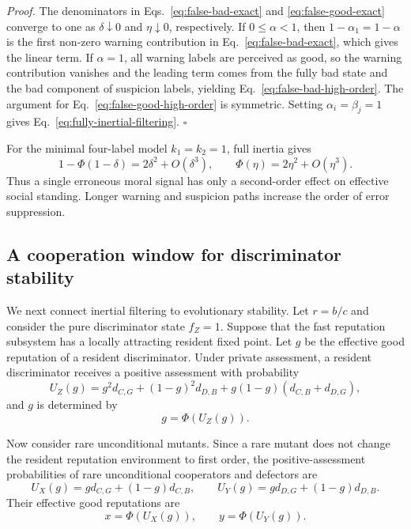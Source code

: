 \documentclass[fleqn,10pt]{wlscirep}
\begin{document}
\textit{Proof.}
The denominators in Eqs.~\eqref{eq:false-bad-exact} and \eqref{eq:false-good-exact} converge to one as $\delta\downarrow 0$ and $\eta\downarrow 0$, respectively. If $0\le\alpha<1$, then $1-\alpha_1=1-\alpha$ is the first non-zero warning contribution in Eq.~\eqref{eq:false-bad-exact}, which gives the linear term. If $\alpha=1$, all warning labels are perceived as good, so the warning contribution vanishes and the leading term comes from the fully bad state and the bad component of suspicion labels, yielding Eq.~\eqref{eq:false-bad-high-order}. The argument for Eq.~\eqref{eq:false-good-high-order} is symmetric. Setting $\alpha_i=\beta_j=1$ gives Eq.~\eqref{eq:fully-inertial-filtering}. \hfill$\square$

For the minimal four-label model $k_1=k_2=1$, full inertia gives
\[
1-\Phi(1-\delta)=2\delta^2+O(\delta^3),\qquad
\Phi(\eta)=2\eta^2+O(\eta^3).
\]
Thus a single erroneous moral signal has only a second-order effect on effective social standing. Longer warning and suspicion paths increase the order of error suppression.

\subsection*{A cooperation window for discriminator stability}

We next connect inertial filtering to evolutionary stability. Let $r=b/c$ and consider the pure discriminator state $f_Z=1$. Suppose that the fast reputation subsystem has a locally attracting resident fixed point. Let $g$ be the effective good reputation of a resident discriminator. Under private assessment, a resident discriminator receives a positive assessment with probability
\begin{equation}
\label{eq:disc-resident-u-theory}
U_Z(g)=g^2d_{C,G}+(1-g)^2d_{D,B}+g(1-g)(d_{C,B}+d_{D,G}),
\end{equation}
and $g$ is determined by
\begin{equation}
\label{eq:disc-resident-fixed-point-theory}
g=\Phi(U_Z(g)).
\end{equation}

Now consider rare unconditional mutants. Since a rare mutant does not change the resident reputation environment to first order, the positive-assessment probabilities of rare unconditional cooperators and defectors are
\[
U_X(g)=gd_{C,G}+(1-g)d_{C,B},\qquad
U_Y(g)=gd_{D,G}+(1-g)d_{D,B}.
\]
Their effective good reputations are
\begin{equation}
\label{eq:mutant-reputations-theory}
x=\Phi(U_X(g)),\qquad y=\Phi(U_Y(g)).
\end{equation}
\end{document}
